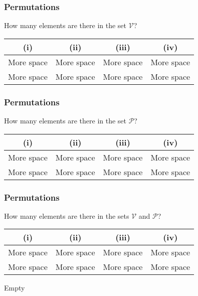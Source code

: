 \documentclass{beamer}
\begin{document}
\begin{frame}

\frametitle{Permutations}
\Large
How many elements are there in the set $\mathcal{V}$?
\begin{center}
\begin{tabular}{|c|c|c|c|}
\hline (i) &  (ii) &  (iii) &  (iv) \\ 
\hline {\color{white}More space} &{\color{white}More space}  & {\color{white}More space} &{\color{white}More space}  \\ 
 {\color{white}More space} &{\color{white}More space}  & {\color{white}More space} &{\color{white}More space}  \\ 
\hline 
\end{tabular} 
\end{center}
\end{frame}

\begin{frame}

\frametitle{Permutations}
\Large
How many elements are there in the set $\mathcal{P}$?
\begin{center}
\begin{tabular}{|c|c|c|c|}
\hline (i) &  (ii) &  (iii) &  (iv) \\ 
\hline {\color{white}More space} &{\color{white}More space}  & {\color{white}More space} &{\color{white}More space}  \\ 
 {\color{white}More space} &{\color{white}More space}  & {\color{white}More space} &{\color{white}More space}  \\ 
\hline 
\end{tabular} 
\end{center}
\end{frame}
\begin{frame}

\frametitle{Permutations}
\Large
How many elements are there in the sets $\mathcal{V}$ and $\mathcal{P}$?
\begin{center}
\begin{tabular}{|c|c|c|c|}
\hline (i) &  (ii) &  (iii) &  (iv) \\ 
\hline {\color{white}More space} &{\color{white}More space}  & {\color{white}More space} &{\color{white}More space}  \\ 
 {\color{white}More space} &{\color{white}More space}  & {\color{white}More space} &{\color{white}More space}  \\ 
\hline 
\end{tabular} 
\end{center}
\end{frame}
\begin{frame}
Empty
\end{frame}
\end{document}
